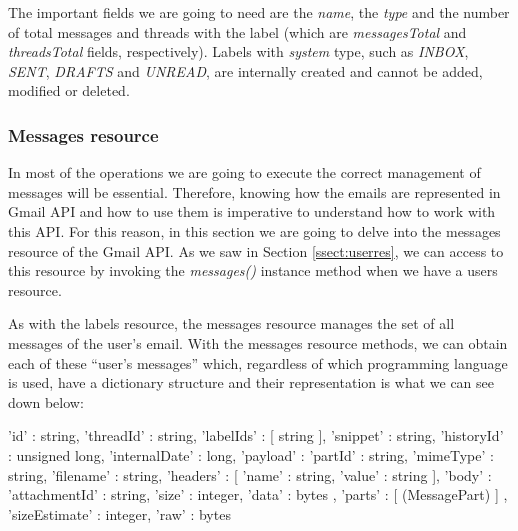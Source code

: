 The important fields we are going to need are the \textit{name}, the \textit{type} and the number of total messages and threads with the label (which are \textit{messagesTotal} and \textit{threadsTotal} fields, respectively). Labels with \textit{system} type, such as \textit{INBOX}, \textit{SENT}, \textit{DRAFTS} and \textit{UNREAD}, are internally created and cannot be added, modified or deleted.

\subsubsection{Messages resource}\label{sssect:msgres}
In most of the operations we are going to execute the correct management of messages will be essential. Therefore, knowing how the emails are represented in Gmail API and how to use them is imperative to understand how to work with this API. For this reason, in this section we are going to delve into the messages resource \citep[/v1/reference/users/messages]{gmailAPI} of the Gmail API. As we saw in Section \ref{ssect:userres}, we can access to this resource by invoking the \textit{messages()} instance method when we have a users resource.

As with the labels resource, the messages resource manages the set of all messages of the user's email. With the messages resource methods, we can obtain each of these ``user's messages'' which, regardless of which programming language is used, have a dictionary structure and their representation is what we can see down below:

\begin{python}
	{
		'id' : string,
		'threadId' : string,
		'labelIds' : [ string ],
		'snippet' : string,
		'historyId' : unsigned long,
		'internalDate' : long,
		'payload' : {
			'partId' : string,
			'mimeType' : string,
			'filename' : string,
			'headers' : [
			{
				'name' : string,
				'value' : string
			}
			],
			'body' : {
				'attachmentId' : string,
				'size' : integer,
				'data' : bytes
			},
			'parts' : [ (MessagePart) ]
		},
		'sizeEstimate' : integer,
		'raw' : bytes
	}
\end{python}

